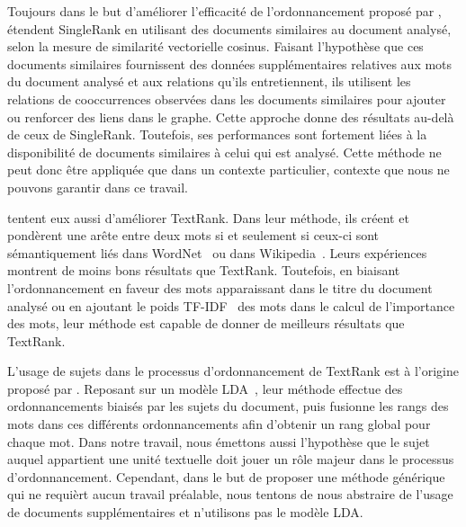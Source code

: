     Toujours dans le but d'améliorer l'efficacité de l'ordonnancement proposé
    par ,  étendent
    SingleRank en utilisant des documents similaires au document analysé, selon
    la mesure de similarité vectorielle cosinus. Faisant l'hypothèse que ces
    documents similaires fournissent des données supplémentaires relatives aux
    mots du document analysé et aux relations qu'ils entretiennent, ils
    utilisent les relations de cooccurrences observées dans les documents
    similaires pour ajouter ou renforcer des liens dans le graphe. Cette
    approche donne des résultats au-delà de ceux de SingleRank. Toutefois, ses
    performances sont fortement liées à la disponibilité de documents similaires
    à celui qui est analysé. Cette méthode ne peut donc être appliquée que dans
    un contexte particulier, contexte que nous ne pouvons garantir dans ce
    travail.

     tentent eux aussi d'améliorer
    TextRank. Dans leur méthode, ils créent et pondèrent une arête entre deux
    mots si et seulement si ceux-ci sont sémantiquement liés dans
    WordNet~\cite{miller1995wordnet} ou dans
    Wikipedia~\cite{milne2008wikipediasemanticrelatedness}. Leurs expériences
    montrent de  moins bons résultats que TextRank. Toutefois, en biaisant
    l'ordonnancement en faveur des mots apparaissant dans le titre du document
    analysé ou en ajoutant le poids TF-IDF~\cite{jones1972tfidf} des mots dans
    le calcul de l'importance des mots, leur méthode est capable de donner de
    meilleurs résultats que TextRank.

    L'usage de sujets dans le processus d'ordonnancement de TextRank est à
    l'origine proposé par . Reposant sur un
    modèle LDA~\cite[Latent Dirichlet Allocation]{blei2003lda}, leur méthode
    effectue des ordonnancements biaisés par les sujets du document, puis
    fusionne les rangs des mots dans ces différents ordonnancements afin
    d'obtenir un rang global pour chaque mot. Dans notre travail, nous émettons
    aussi l'hypothèse que le sujet auquel appartient une unité textuelle doit
    jouer un rôle majeur dans le processus d'ordonnancement. Cependant, dans le
    but de proposer une méthode générique qui ne requièrt aucun travail
    préalable, nous tentons de nous abstraire de l'usage de documents
    supplémentaires et n'utilisons pas le modèle LDA.


